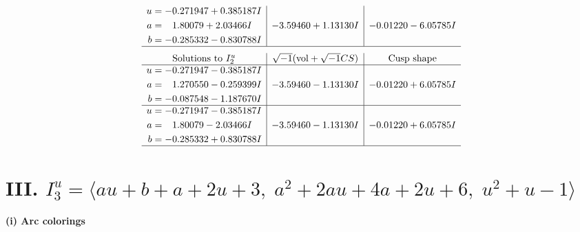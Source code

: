 \documentclass[1p]{elsarticle_modified}
\theoremstyle{definition}
\newcommand{\I}{\sqrt{-1}}
\begin{document}
$$\begin{array}{c|c|c}
\begin{aligned}
u &= -0.271947 + 0.385187 I \\
a &= \phantom{-}1.80079 + 2.03466 I \\
b &= -0.285332 - 0.830788 I\end{aligned}
 & -3.59460 + 1.13130 I & -0.01220 - 6.05785 I\\
 \hline 
 \end{array}$$\newpage$$\begin{array}{c|c|c}  
\text{Solutions to }I^u_{2}& \I (\text{vol} + \sqrt{-1}CS) & \text{Cusp shape}\\
 \hline 
\begin{aligned}
u &= -0.271947 - 0.385187 I \\
a &= \phantom{-}1.270550 - 0.259399 I \\
b &= -0.087548 - 1.187670 I\end{aligned}
 & -3.59460 - 1.13130 I & -0.01220 + 6.05785 I \\ \hline\begin{aligned}
u &= -0.271947 - 0.385187 I \\
a &= \phantom{-}1.80079 - 2.03466 I \\
b &= -0.285332 + 0.830788 I\end{aligned}
 & -3.59460 - 1.13130 I & -0.01220 + 6.05785 I\\
 \hline 
 \end{array}$$\newpage\newpage\renewcommand{\arraystretch}{1}
\centering \section*{III. $I^u_{3}= \langle a u+b+a+2 u+3,\;a^2+2 a u+4 a+2 u+6,\;u^2+u-1 \rangle$}
\flushleft \textbf{(i) Arc colorings}\\
\end{document}
